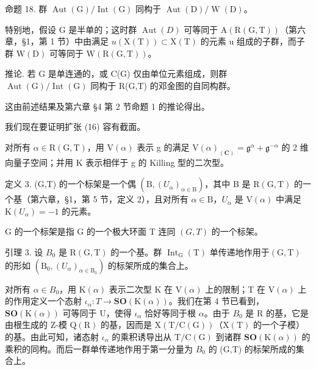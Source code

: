 命题 18. 群 \(\operatorname{Aut}(\mathrm{G}) / \operatorname{Int}(\mathrm{G})\) 同构于 \(\operatorname{Aut}(\mathrm{D}) / \operatorname{W}(\mathrm{D})\)。

特别地，假设 G 是半单的；这时群 \(\operatorname{Aut}(D)\) 可等同于 \(\mathrm{A}(\mathrm{R}(\mathrm{G},\mathrm{T}))\)（第六章，§1，第 1 节）中由满足 \(u(\mathrm{X}(\mathrm{T})) \subset \mathrm{X}(\mathrm{T})\) 的元素 u 组成的子群，而子群 \(\mathrm{W}(\mathrm{D})\) 可等同于 \(\mathrm{W}(\mathrm{R}(\mathrm{G},\mathrm{T}))\)。

推论. 若 G 是单连通的，或 C(G) 仅由单位元素组成，则群 \(\operatorname{Aut}(\mathrm{G})/\operatorname{Int}(\mathrm{G})\) 同构于 R(G,T) 的邓金图的自同构群。

这由前述结果及第六章 §4 第 2 节命题 1 的推论得出。

我们现在要证明扩张 (16) 容有截面。

对所有 \(\alpha\in\mathrm{R}(\mathrm{G},\mathrm{T})\)，用 \(\mathrm{V}(\alpha)\) 表示 g 的满足 \(\mathrm{V}(\alpha)_{(\mathbf{C})}=\mathfrak{g}^{\alpha}+\mathfrak{g}^{-\alpha}\) 的 2 维向量子空间；并用 K 表示相伴于 g 的 Killing 型的二次型。

定义 3. (G,T) 的一个标架是一个偶 \((\mathrm{B},(U_{\alpha})_{\alpha \in \mathrm{B}})\)，其中 B 是 \(\mathrm{R}(\mathrm{G},\mathrm{T})\) 的一个基（第六章，§1，第 5 节，定义 2），且对所有 \(\alpha \in \mathrm{B}\)，\(U_{\alpha}\) 是 \(\mathrm{V}(\alpha)\) 中满足 \(\mathrm{K}(U_{\alpha}) = -1\) 的元素。

G 的一个标架是指 G 的一个极大环面 T 连同 \((G, T)\) 的一个标架。

引理 3. 设 \(B_{0}\) 是 \(\mathrm{R}(\mathrm{G},\mathrm{T})\) 的一个基。群 \(\operatorname{Int}_{\mathrm{G}}(\mathrm{T})\) 单传递地作用于\((\mathrm{G},\mathrm{T})\) 的形如 \((\mathrm{B}_{0},(U_{\alpha})_{\alpha\in\mathrm{B}_{0}})\) 的标架所成的集合上。

对所有 \(\alpha\in B_{0}\)，用 \(\mathrm{K}(\alpha)\) 表示二次型 K 在 \(\mathrm{V}(\alpha)\) 上的限制；T 在 \(\mathrm{V}(\alpha)\) 上的作用定义一个态射 \(\iota_{\alpha}:T\to\mathbf{SO}(\mathrm{K}(\alpha))\)。我们在第 4 节已看到，\(\mathbf{SO}(\mathrm{K}(\alpha))\) 可等同于 U，使得 \(\iota_{\alpha}\) 恰好等同于根 \(\alpha\)。由于 \(B_{0}\) 是 R 的基，它是由根生成的 Z-模 \(\mathrm{Q}(\mathrm{R})\) 的基，因而是 \(\mathrm{X}(\mathrm{T}/\mathrm{C}(\mathrm{G}))\)（\(\mathrm{X}(\mathrm{T})\) 的一个子模）的基。由此可知，诸态射 \(\iota_{\alpha}\) 的乘积诱导出从 \(\mathrm{T}/\mathrm{C}(\mathrm{G})\) 到诸群 \(\mathbf{SO}(\mathrm{K}(\alpha))\) 的乘积的同构。而后一群单传递地作用于第一分量为 \(B_{0}\) 的 (G,T) 的标架所成的集合上。

